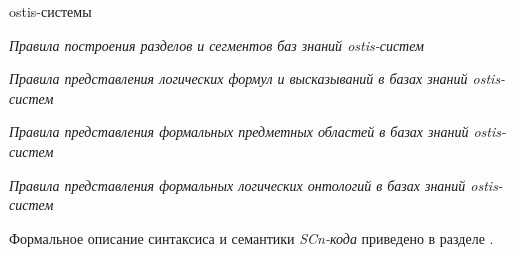 \begin{SCn}
{\begin{scnvector}
{\begin{scnitemize}
				            ostis-системы
				            \item \textit{Правила построения разделов и сегментов
					            баз знаний ostis-систем}
				            \item \textit{Правила представления логических формул и высказываний в базах знаний ostis-систем}
				            \item \textit{Правила представления формальных предметных областей в базах знаний ostis-систем}
				            \item \textit{Правила представления формальных логических онтологий в базах знаний ostis-систем}
			            \end{scnitemize}}
			\item{Формальное описание синтаксиса и семантики
			            \textit{SCn-кода} приведено в разделе .}
		\end{scnvector}
	}


\end{SCn}
